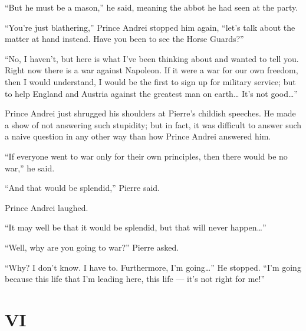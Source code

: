 ``But he must be a mason,'' he said, meaning the abbot he had seen at the party. %

``You're just blathering,'' Prince Andrei stopped him again, ``let's talk about the matter at hand instead. Have you been to see the Horse Guards?'' %

``No, I haven't, but here is what I've been thinking about and wanted to tell you. Right now there is a war against Napoleon. If it were a war for our own freedom, then I would understand, I would be the first to sign up for military service; but to help England and Austria against the greatest man on earth\ldots{} It's not good\ldots{}'' %

Prince Andrei just shrugged his shoulders at Pierre's childish speeches. He made a show of not answering such stupidity; but in fact, it was difficult to answer such a naive question in any other way than how Prince Andrei answered him.

``If everyone went to war only for their own principles, then there would be no war,'' he said. %

``And that would be splendid,'' Pierre said. %

Prince Andrei laughed.

``It may well be that it would be splendid, but that will never happen\ldots{}'' %

``Well, why are you going to war?'' Pierre asked. %

``Why? I don't know. I have to. Furthermore, I'm going\ldots{}'' He stopped. ``I'm going because this life that I'm leading here, this life --- it's not right for me!'' %

\section*{VI} %


